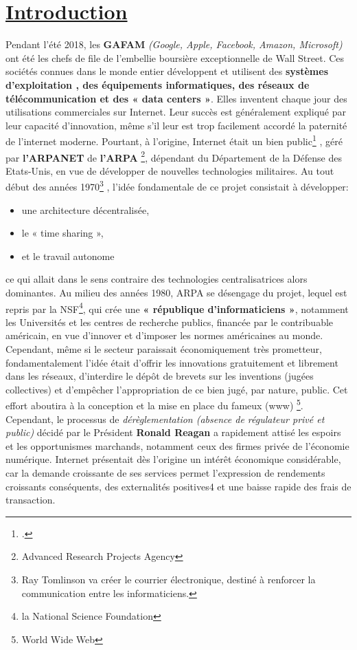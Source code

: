 \documentclass[12pt,a4paper]{article} %
\begin{document}
	\section{\underline{Introduction}}
	Pendant l’été 2018, les \textbf{GAFAM} \textit{(Google, Apple, Facebook, Amazon, Microsoft)} ont été les chefs de file de l’embellie boursière exceptionnelle de Wall Street. Ces sociétés connues dans le monde entier développent et utilisent des \textbf{systèmes d’exploitation , des équipements informatiques, des réseaux de télécommunication et des « data centers »}. Elles inventent chaque jour des utilisations commerciales sur Internet. Leur succès est généralement expliqué par leur capacité d’innovation, même s’il leur est trop facilement accordé la paternité de l’internet moderne.
	Pourtant, à l’origine, Internet était un bien public\footcite{Smyrnaios2017} , géré par \textbf{l’ARPANET} de \textbf{l’ARPA} \footnote[2]{Advanced Research Projects Agency}, dépendant du Département de la Défense des Etats-Unis, en vue de développer de nouvelles technologies militaires. Au tout début des années 1970\footnote[3]{Ray Tomlinson va créer le courrier électronique, destiné à renforcer la communication entre les informaticiens.} , l’idée fondamentale de ce projet consistait à développer:\begin{itemize}
		\item  une architecture décentralisée,
		\item le « time sharing »,
		\item et le travail autonome
	\end{itemize}    ce qui allait dans le sens contraire des technologies centralisatrices alors dominantes.
	Au milieu des années 1980, ARPA se désengage du projet, lequel est repris par la NSF\footnote[4]{la National Science Foundation}, qui crée une \textbf{ « république d’informaticiens »}, notamment les Universités et les centres de recherche publics, financée par le contribuable américain, en vue d’innover et d’imposer les normes américaines au monde. Cependant, même si le secteur paraissait économiquement très prometteur, fondamentalement l’idée était d’offrir les innovations gratuitement et librement dans les réseaux, d’interdire le dépôt de brevets sur les inventions (jugées collectives) et d’empêcher l’appropriation de ce bien jugé, par nature, public. Cet effort aboutira à la conception et la mise en place du fameux (www) \footnote[5]{World Wide Web}. 
	Cependant, le processus de \textit{dérèglementation (absence de régulateur privé et public)} décidé par le Président \textbf{Ronald Reagan} a rapidement attisé les espoirs et les opportunismes marchands, notamment ceux des firmes privée de l’économie numérique. Internet présentait dès l’origine un intérêt économique considérable, car la demande croissante de ses services permet l’expression de rendements croissants conséquents, des externalités positives4 et une baisse rapide des frais de transaction.
	
\end{document}
